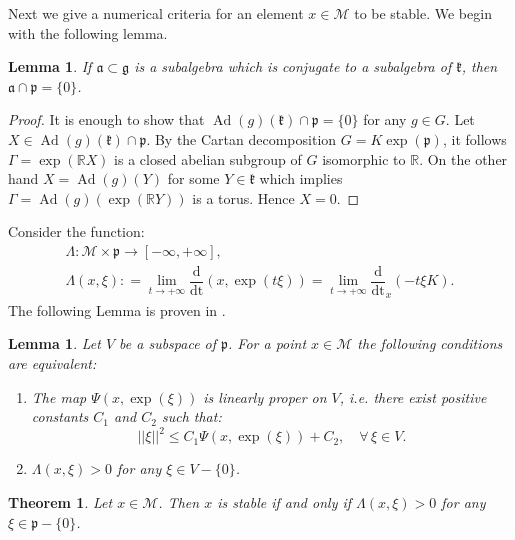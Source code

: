 \documentclass[leqno,11pt, a4]{amsart}
\newtheorem{teo}[equation]{Theorem}
\newtheorem{lemma}[equation]{Lemma}
\theoremstyle{named}
\begin{document}
Next we give a numerical criteria for an element $x\in {\mathscr{M}}$ to be stable. We begin with the following lemma.
\begin{lemma}\label{intersezione-nulla}
If ${\mathfrak{a}} \subset {\mathfrak{g}}$ is a subalgebra which is conjugate to a
    subalgebra of ${\mathfrak{k}}$, then ${\mathfrak{a}} \cap {\mathfrak{p}} =\{0\}$.
  \end{lemma}
  \begin{proof}
    It is enough to show that ${\operatorname{Ad}} (g)( {\mathfrak{k}}) \cap  {\mathfrak{p}} =\{0\}$
    for any $g\in G$.
  Let $X\in {\operatorname{Ad}} (g)( {\mathfrak{k}}) \cap  {\mathfrak{p}}$. By the Cartan decomposition $G=K\exp ({\mathfrak{p}})$, it follows $\Gamma =\exp({\mathbb{R}} X)$ is a closed abelian subgroup of $G$ isomorphic to ${\mathbb{R}}$. On the other hand $X={\operatorname{Ad}}(g)(Y)$ for some $Y\in {\mathfrak{k}}$ which implies   $\Gamma={\operatorname{Ad}}(g)(\exp({\mathbb{R}} Y))$ is a torus. Hence   $X=0$.
\end{proof}
Consider the function: 
\begin{gather*}
  {\Lambda} : {\mathscr{M}} \times {\mathfrak{p}} {\rightarrow} [-\infty, +\infty],\\
  {\Lambda}(x, \xi) : = \lim_{t\to +\infty} {\dfrac {\mathrm {d}  }{\mathrm {dt}}}(x,\exp(t\xi))= \lim _{t\to +\infty} {\dfrac {\mathrm {d}  }{\mathrm {dt}}}_x (-t\xi K  ).
\end{gather*}
The following Lemma is proven in \cite[Lemma 2.10]{teleman-symplectic-stability}.
\begin{lemma}\label{linear-proper}
Let $V$ be a subspace of ${\mathfrak{p}}$. For a point $x\in {\mathscr{M}}$ the following conditions are equivalent:
\begin{enumerate}
\item The map 	$\Psi(x, \exp (\xi))$ is linearly proper on $V$, i.e. there exist positive constants
$C_1$ and $C_2$ such that:
\[
||\xi ||^2 \leq C_1 \Psi(x,\exp(\xi))+C_2, \quad \forall\, \xi \in V.
\]
\item $\Lambda(x,\xi)>0$ for any $\xi\in V{-}\{0\}$.
\end{enumerate}
\end{lemma}
\begin{teo}\label{stabile}
Let $x\in {\mathscr{M}}$.
Then $x$ is stable if and only if ${\Lambda}(x,\xi) >0 $ for any $\xi \in {\mathfrak{p}} {-}\{0\}$.
\end{teo}
\end{document}
